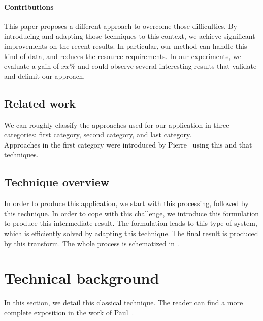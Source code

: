 \documentclass[10pt, conference]{IEEEtran}
\begin{document}
\paragraph*{Contributions}
%
This paper proposes a different approach to overcome those difficulties. By introducing and adapting those techniques to this context, we achieve significant improvements on the recent results. In particular, our method can handle this kind of data, and reduces the resource requirements. In our experiments, we evaluate a gain of $xx\%$ and could observe several interesting results that validate and delimit our approach.


\subsection{Related work}
%
We can roughly classify the approaches used for our application in three categories: first category, second category, and last category.\\
Approaches in the first category were introduced by Pierre~\cite{Sibgrapi2015} using this and that techniques.


\subsection{Technique overview}
%
In order to produce this application, we start with this processing, followed by this technique. In order to cope with this challenge, we introduce this formulation to produce this intermediate result. The formulation leads to this type of system, which is efficiently solved by adapting this technique. The final result is produced by this transform. The whole process is schematized in .



\section{Technical background}
%
In this section, we detail this classical technique. The reader can find a more complete exposition in the work of Paul~\cite{Sibgrapi2015}.
\end{document}
